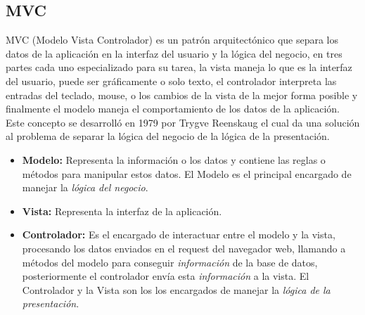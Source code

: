 \subsection{MVC} %
\label{sub:mvc}
  MVC (Modelo Vista  Controlador) es un patrón arquitectónico que separa
  los datos de la aplicación en la interfaz del usuario y  la lógica del
  negocio, en tres partes cada uno especializado para su tarea, la vista
  maneja lo que es la interfaz del usuario, puede ser gráficamente o solo texto,
  el controlador interpreta las entradas del teclado, mouse, o los cambios
  de la vista de la mejor forma posible y finalmente el modelo maneja el comportamiento
  de los datos de la aplicación. \cite{steveburbeck1992}\\

  Este concepto se desarrolló en 1979 por Trygve Reenskaug el cual da una
  solución al problema de separar la lógica del negocio de la lógica de la presentación.\\


  \begin{itemize}
    \item \textbf{Modelo:} Representa la información o los datos y contiene las reglas o métodos para manipular estos datos.
    El Modelo es el principal encargado de manejar  la \emph{lógica del negocio}.


    \item \textbf{Vista:}  Representa la interfaz de la aplicación.

    \item \textbf{Controlador:} Es el encargado de interactuar entre el modelo y la vista, procesando los datos enviados en el request del navegador web,
        llamando a métodos del modelo para conseguir  \emph{información} de la base de datos,
        posteriormente el controlador envía esta \emph{información} a la vista.
        El Controlador y la Vista son los los encargados de manejar  la \emph{lógica de la presentación}.
  \end{itemize}




